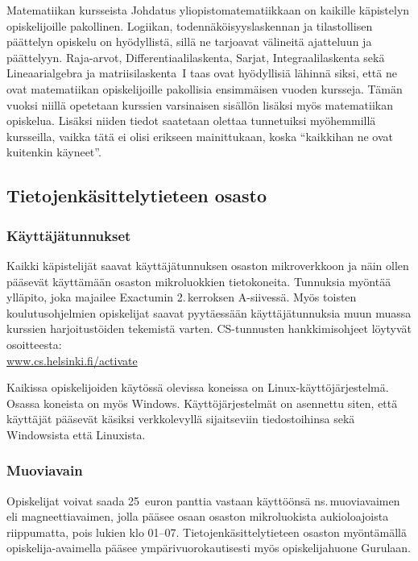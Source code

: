 \documentclass[../ala_hataile.tex]{subfiles}
\begin{document}
	Matematiikan kursseista Johdatus yliopistomatematiikkaan
	on kaikille käpistelyn opiskelijoille
	pakollinen. Logiikan,
	todennäköisyyslaskennan ja tilastollisen
	päättelyn opiskelu on hyödyllistä, sillä ne
	tarjoavat välineitä ajatteluun ja päättelyyn.
	Raja-arvot, Differentiaalilaskenta, Sarjat,
	Integraalilaskenta sekä Lineaarialgebra ja
	matriisilaskenta~I taas ovat hyödyllisiä lähinnä
	siksi, että ne ovat matematiikan opiskelijoille
	pakollisia ensimmäisen vuoden kursseja. 
	Tämän vuoksi niillä opetetaan kurssien 
	varsinaisen sisällön lisäksi
	myös matematiikan opiskelua. Lisäksi
	niiden tiedot saatetaan olettaa tunnetuiksi
	myöhemmillä kursseilla, vaikka tätä ei olisi
	erikseen mainittukaan, koska ``kaikkihan
	ne ovat kuitenkin käyneet''.
	
	\subsection*{Tietojen\-käsittely\-tieteen osasto}
	
	\subsubsection*{Käyttäjätunnukset}
	Kaikki käpistelijät saavat käyttäjä\-tunnuksen
	osaston mikro\-verkkoon
	ja näin ollen pääsevät käyttämään osaston
	mikro\-luokkien tieto\-koneita. Tunnuksia
	myöntää yllä\-pito, joka majailee
	Exactumin 2.\,kerroksen A-siivessä. Myös
	toisten koulutus\-ohjelmien opiskelijat saavat pyytäessään
	käyttäjä\-tunnuksia muun muassa kurssien
	harjoitus\-töiden tekemistä varten. CS-tunnusten hankkimis\-ohjeet löytyvät osoitteesta:
	\\\url{www.cs.helsinki.fi/activate}
	
	Kaikissa opiskelijoiden käytössä olevissa
	koneissa on Linux-käyttöjärjestelmä.
	Osassa koneista on myös Windows. Käyttöjärjestelmät
	on asennettu siten, että käyttäjät
	pääsevät käsiksi verkkolevyllä sijaitseviin
	tiedostoihinsa sekä Windowsista että Linuxista.
	
	\subsubsection*{Muoviavain}
	Opiskelijat voivat saada 25~euron panttia
	vastaan käyttöönsä ns.\,muovi\-avaimen
	eli magneetti\-avaimen, jolla pääsee osaan
	osaston mikro\-luokista auki\-olo\-ajoista 
	riippumatta, pois lukien klo 01--07. 
	Tietojen\-käsittely\-tieteen osaston myöntämällä
	opiskelija-avaimella pääsee ympäri\-vuoro\-kautisesti myös
	opiskelijahuone Gurulaan.
	
\end{document}
